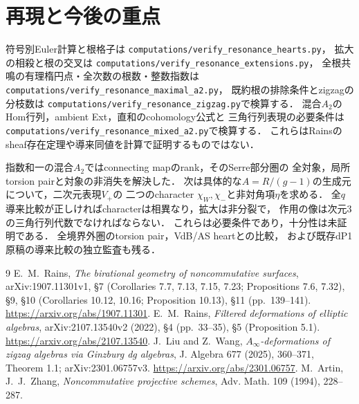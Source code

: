 \documentclass[11pt,a4paper]{ltjsarticle}
\theoremstyle{definition}\newtheorem{remark}[theorem]{注意}
\begin{document}
\section{再現と今後の重点}
符号別Euler計算と根格子は
\texttt{computations/verify\_resonance\_hearts.py}，
拡大の相殺と根の交叉は
\texttt{computations/verify\_resonance\_extensions.py}，
全根共鳴の有理楕円点・全次数の根数・整数指数は
\texttt{computations/verify\_resonance\_maximal\_a2.py}，
既約根の排除条件とzigzagの分枝数は
\texttt{computations/verify\_resonance\_zigzag.py}で検算する．
混合$A_2$のHom行列，ambient Ext，直和のcohomology公式と
三角行列表現の必要条件は
\texttt{computations/verify\_resonance\_mixed\_a2.py}で検算する．
これらはRainsのsheaf存在定理や導来同値を計算で証明するものではない．

指数和一の混合$A_2$ではconnecting mapのrank，そのSerre部分圏の
全対象，局所torsion pairと対象の非消失を解決した．
次は具体的な$A=R/(g-1)$の生成元について，二次元表現$V_+$の
二つのcharacter $\chi_W,\chi_-$と非対角項$\eta$を求める．
全$q$導来比較が正しければcharacterは相異なり，拡大は非分裂で，
作用の像は次元3の三角行列代数でなければならない．
これらは必要条件であり，十分性は未証明である．
全境界外圏のtorsion pair，VdB/AS heartとの比較，
および既存dP1原稿の導来比較の独立監査も残る．

\begin{thebibliography}{9}
E.~M.~Rains, \emph{The birational geometry of noncommutative surfaces},
arXiv:1907.11301v1, \S7 (Corollaries 7.7, 7.13, 7.15, 7.23;
Propositions 7.6, 7.32), \S9,
\S10 (Corollaries 10.12, 10.16; Proposition 10.13),
\S11 (pp.~139--141).
\url{https://arxiv.org/abs/1907.11301}.
E.~M.~Rains, \emph{Filtered deformations of elliptic algebras},
arXiv:2107.13540v2 (2022), \S4 (pp.~33--35), \S5 (Proposition 5.1).
\url{https://arxiv.org/abs/2107.13540}.
 J.~Liu and Z.~Wang,
\emph{$A_\infty$-deformations of zigzag algebras via Ginzburg dg algebras},
J. Algebra 677 (2025), 360--371, Theorem 1.1;
arXiv:2301.06757v3.
\url{https://arxiv.org/abs/2301.06757}.
M.~Artin, J.~J.~Zhang, \emph{Noncommutative projective schemes},
Adv. Math. 109 (1994), 228--287.
\end{thebibliography}
\end{document}
